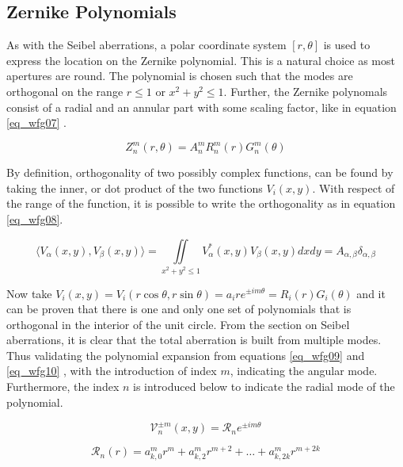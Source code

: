 \documentclass{article}
\begin{document}
\subsection{Zernike Polynomials}
As with the Seibel aberrations, a polar coordinate system $[r,\theta]$ is used to express the location on the Zernike polynomial. This is a natural choice as most apertures are round. The polynomial is chosen such that the modes are orthogonal on the range $r \leq 1$ or $x^2 + y^2 \leq 1$. Further, the Zernike polynomals consist of a radial and an annular part with some scaling factor, like in equation \ref{eq_wfg07} \cite{zernikeCircle}.

\begin{equation}
Z^{m}_{n}(r,\theta) = A^{m}_{n} R^{m}_{n}(r) G^{m}_{n}(\theta)
\label{eq_wfg07}
\end{equation}

By definition, orthogonality of two possibly complex functions, can be found by taking the inner, or dot product of the two functions $V_i(x,y)$. With respect of the range of the function, it is possible to write the orthogonality as in equation \ref{eq_wfg08}.

\begin{equation}
\langle V_{\alpha}(x,y) , V_{\beta}(x,y) \rangle = \iint \limits_{x^2 + y^2 \leq 1} V_{\alpha}^{*}(x,y) V_{\beta}(x,y) dx dy = A_{\alpha,\beta} \delta_{\alpha,\beta}
\label{eq_wfg08}
\end{equation}

Now take $V_i(x,y) = V_i(r \cos \theta, r \sin \theta) = a_i r e^{\pm i m \theta} = R_i(r) G_i(\theta)$ and it can be proven that there is one and only one set of polynomials that is orthogonal in the interior of the unit circle. From the section on Seibel aberrations, it is clear that the total aberration is built from multiple modes. Thus validating the polynomial expansion from equations \ref{eq_wfg09} and \ref{eq_wfg10} \cite{zernikeCircle}, with the introduction of index $m$, indicating the angular mode. Furthermore, the index $n$ is introduced below to indicate the radial mode of the polynomial.

\begin{equation}
\mathcal{V}^{\pm m}_{n}(x,y)  = \mathcal{R}_{n} e^{\pm i m \theta}
\label{eq_wfg09}
\end{equation}

\begin{equation}
\mathcal{R}_{n}(r) = a^{m}_{k,0} r^{m} + a^{m}_{k,2} r^{m+2} +\dots+ a^{m}_{k,2k} r^{m+2k}
\label{eq_wfg10}
\end{equation}
\end{document}
